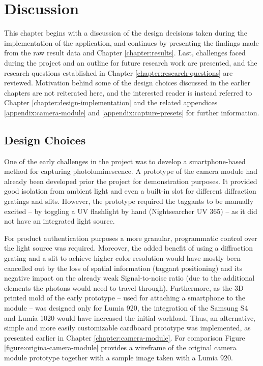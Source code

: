 \documentclass[thesis.tex]{subfiles}
\begin{document}
\chapter{Discussion}
\label{chapter:discussion}

This chapter begins with a discussion of the design decisions taken during the implementation of the application, and continues by presenting the findings made from the raw result data and Chapter \ref{chapter:results}. Last, challenges faced during the project and an outline for future research work are presented, and the research questions established in Chapter \ref{chapter:research-questions} are reviewed. Motivation behind some of the design choices discussed in the earlier chapters are not reiterated here, and the interested reader is instead referred to Chapter \ref{chapter:design-implementation} and the related appendices \ref{appendix:camera-module} and \ref{appendix:capture-presets} for further information.

\section{Design Choices}

One of the early challenges in the project was to develop a smartphone-based method for capturing photoluminescence. A prototype of the camera module had already been developed prior the project for demonstration purposes. It provided good isolation from ambient light and even a built-in slot for different diffraction gratings and slits. However, the prototype required the taggants to be manually excited -- by toggling a UV flashlight by hand (Nightsearcher UV 365) -- as it did not have an integrated light source.

For product authentication purposes a more granular, programmatic control over the light source was required. Moreover, the added benefit of using a diffraction grating and a slit to achieve higher color resolution would have mostly been cancelled out by the loss of spatial information (taggant positioning) and its negative impact on the already weak Signal-to-noise ratio (due to the additional elements the photons would need to travel through). Furthermore, as the 3D printed mold of the early prototype -- used for attaching a smartphone to the module -- was designed only for Lumia 920, the integration of the Samsung S4 and Lumia 1020 would have increased the initial workload. Thus, an alternative, simple and more easily customizable cardboard prototype was implemented, as presented earlier in Chapter \ref{chapter:camera-module}. For comparison Figure \ref{figure:origina-camera-module} provides a wireframe of the original camera module prototype together with a sample image taken with a Lumia 920.
\end{document}
